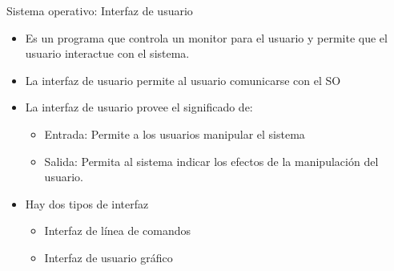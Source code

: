 \documentclass[11pt]{beamer}
\begin{document}
		\begin{frame}{Sistema operativo: Interfaz de usuario}
			\begin{itemize}
				\item Es un programa que controla un monitor para el usuario y permite que el usuario interactue con el sistema.
				\item La interfaz de usuario permite al usuario comunicarse con el SO
				\item La interfaz de usuario provee el significado de:
				\begin{itemize}
					\item Entrada: Permite a los usuarios manipular el sistema
					\item Salida: Permita al sistema indicar los efectos de la manipulación del usuario.
				\end{itemize}
				\item Hay dos tipos de interfaz
				\begin{itemize}
					\item Interfaz de línea de comandos
					\item Interfaz de usuario gráfico
				\end{itemize}
			\end{itemize}
		\end{frame}
\end{document}
